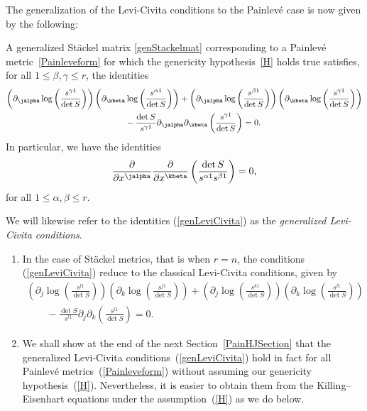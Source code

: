 The generalization of the Levi-Civita conditions to the Painlev\'e case is now given by the following:
\begin{Lemma} \label{LeviCivita}
A generalized St\"ackel matrix \eqref{genStackelmat} corresponding to a Painlev\'e metric~\eqref{Painleveform} for which the genericity hypothesis~\eqref{H} holds true satisfies, for all $1\leq \beta, \gamma \leq r$,
the identities
\begin{gather}
\left(\partial_{\jalpha}\log\left(\frac{s^{\gamma 1}}{\det S}\right)\right) \left(\partial_{\kbeta}\log\left(\frac{s^{\alpha 1}}{\det S}\right)\right)+\left(\partial_{\jalpha}\log\left(\frac{s^{\beta 1}}{\det S}\right)\right)\left(\partial_{\kbeta}\log\left(\frac{s^{\gamma 1}}{\det S}\right)\right)\nonumber\\
\qquad{} -\frac{\det S}{s^{\gamma 1}}\partial_{\jalpha}\partial_{\kbeta}\left(\frac{s^{\gamma 1}}{\det S}\right)=0.\label{genLeviCivita}
\end{gather}
In particular, we have the identities
\begin{gather}\label{secondorder}
\frac{\partial}{\partial x^{\jalpha}}\frac{\partial }{\partial x^{\kbeta}}\left(\frac{\det S}{s^{\alpha1}s^{\beta1}}\right)=0,
\end{gather}
for all
$1\leq \alpha, \beta \leq r$.
\end{Lemma}
We will likewise refer to the identities (\ref{genLeviCivita}) as the {\emph{generalized Levi-Civita conditions}}.
\begin{Remark}\quad
\begin{enumerate}\itemsep=0pt
\item[1)] In the case of St\"ackel metrics, that is when $r=n$, the conditions (\ref{genLeviCivita}) reduce to the classical Levi-Civita conditions, given by
\begin{gather*}
\left(\partial_{j}\log\left(\frac{s^{l1}}{\det S}\right)\right)\left(\partial_{k}\log\left(\frac{s^{j1}}{\det S}\right)\right)+\left(\partial_{j}\log\left(\frac{s^{k1}}{\det S}\right)\right)\left(\partial_{k}\log \left(\frac{s^{l1}}{\det S}\right)\right)\\
\qquad{} -\frac{\det S}{s^{l1}}\partial_{j}\partial_{k}\left(\frac{s^{l1}}{\det S}\right)=0.
\end{gather*}
\item[2)] We shall show at the end of the next Section~\ref{PainHJSection} that the generalized Levi-Civita condi\-tions~(\ref{genLeviCivita}) hold in fact for all Painlev\'e metrics~(\ref{Painleveform}) without assuming our genericity hypothesis~(\ref{H}). Nevertheless, it is easier to obtain them from the Killing--Eisenhart equations under the assumption~(\ref{H}) as we do below.
\end{enumerate}
\end{Remark}
